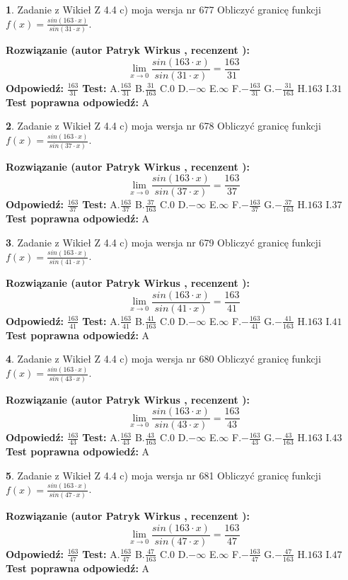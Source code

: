 \documentclass[12pt, a4paper]{article}
\theoremstyle{definition} %
\newtheorem{zad}{}
\newcommand{\zadStart}[1]{\begin{zad}#1\newline}
\newcommand{\zadStop}{\end{zad}}
\newcommand{\rozwStart}[2]{\noindent \textbf{Rozwiązanie (autor #1 , recenzent #2): }\newline}
\newcommand{\rozwStop}{\newline}
\newcommand{\odpStart}{\noindent \textbf{Odpowiedź:}\newline}
\newcommand{\odpStop}{\newline}
\newcommand{\testStart}{\noindent \textbf{Test:}\newline}
\newcommand{\testStop}{\newline}
\newcommand{\kluczStart}{\noindent \textbf{Test poprawna odpowiedź:}\newline}
\newcommand{\kluczStop}{\newline}
\begin{document}
\zadStart{Zadanie z Wikieł Z 4.4 c) moja wersja nr 677}
Obliczyć granicę funkcji $f(x)=\frac{sin(163\cdot x)}{sin(31\cdot x)}$.
\zadStop
\rozwStart{Patryk Wirkus}{}
$$\lim\limits_{x\to 0}\frac{sin(163\cdot x)}{sin(31\cdot x)}=
\frac{163}{31}$$
\rozwStop
\odpStart
$\frac{163}{31}$
\odpStop
\testStart
A.$\frac{163}{31}$
B.$\frac{31}{163}$
C.$0$
D.$-\infty$
E.$\infty$
F.$-\frac{163}{31}$
G.$-\frac{31}{163}$
H.$163$
I.$31$
\testStop
\kluczStart
A
\kluczStop



\zadStart{Zadanie z Wikieł Z 4.4 c) moja wersja nr 678}
Obliczyć granicę funkcji $f(x)=\frac{sin(163\cdot x)}{sin(37\cdot x)}$.
\zadStop
\rozwStart{Patryk Wirkus}{}
$$\lim\limits_{x\to 0}\frac{sin(163\cdot x)}{sin(37\cdot x)}=
\frac{163}{37}$$
\rozwStop
\odpStart
$\frac{163}{37}$
\odpStop
\testStart
A.$\frac{163}{37}$
B.$\frac{37}{163}$
C.$0$
D.$-\infty$
E.$\infty$
F.$-\frac{163}{37}$
G.$-\frac{37}{163}$
H.$163$
I.$37$
\testStop
\kluczStart
A
\kluczStop



\zadStart{Zadanie z Wikieł Z 4.4 c) moja wersja nr 679}
Obliczyć granicę funkcji $f(x)=\frac{sin(163\cdot x)}{sin(41\cdot x)}$.
\zadStop
\rozwStart{Patryk Wirkus}{}
$$\lim\limits_{x\to 0}\frac{sin(163\cdot x)}{sin(41\cdot x)}=
\frac{163}{41}$$
\rozwStop
\odpStart
$\frac{163}{41}$
\odpStop
\testStart
A.$\frac{163}{41}$
B.$\frac{41}{163}$
C.$0$
D.$-\infty$
E.$\infty$
F.$-\frac{163}{41}$
G.$-\frac{41}{163}$
H.$163$
I.$41$
\testStop
\kluczStart
A
\kluczStop



\zadStart{Zadanie z Wikieł Z 4.4 c) moja wersja nr 680}
Obliczyć granicę funkcji $f(x)=\frac{sin(163\cdot x)}{sin(43\cdot x)}$.
\zadStop
\rozwStart{Patryk Wirkus}{}
$$\lim\limits_{x\to 0}\frac{sin(163\cdot x)}{sin(43\cdot x)}=
\frac{163}{43}$$
\rozwStop
\odpStart
$\frac{163}{43}$
\odpStop
\testStart
A.$\frac{163}{43}$
B.$\frac{43}{163}$
C.$0$
D.$-\infty$
E.$\infty$
F.$-\frac{163}{43}$
G.$-\frac{43}{163}$
H.$163$
I.$43$
\testStop
\kluczStart
A
\kluczStop



\zadStart{Zadanie z Wikieł Z 4.4 c) moja wersja nr 681}
Obliczyć granicę funkcji $f(x)=\frac{sin(163\cdot x)}{sin(47\cdot x)}$.
\zadStop
\rozwStart{Patryk Wirkus}{}
$$\lim\limits_{x\to 0}\frac{sin(163\cdot x)}{sin(47\cdot x)}=
\frac{163}{47}$$
\rozwStop
\odpStart
$\frac{163}{47}$
\odpStop
\testStart
A.$\frac{163}{47}$
B.$\frac{47}{163}$
C.$0$
D.$-\infty$
E.$\infty$
F.$-\frac{163}{47}$
G.$-\frac{47}{163}$
H.$163$
I.$47$
\testStop
\kluczStart
A
\kluczStop
\end{document}
